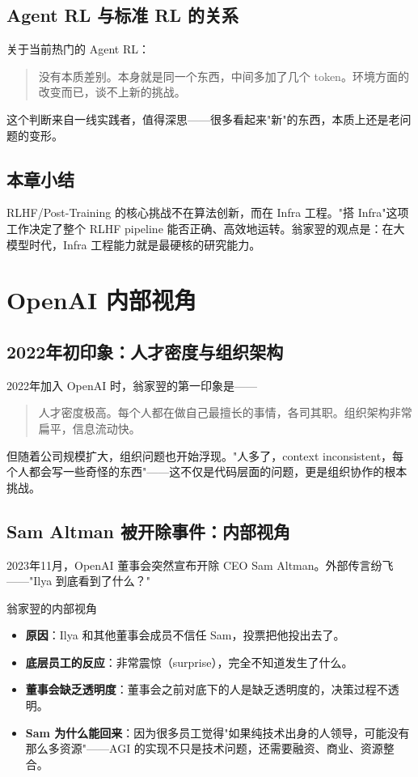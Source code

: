 \documentclass[a4paper]{article}
\begin{document}
\subsection{Agent RL 与标准 RL 的关系}

关于当前热门的 Agent RL：

\begin{quote}
没有本质差别。本身就是同一个东西，中间多加了几个 token。环境方面的改变而已，谈不上新的挑战。
\end{quote}

这个判断来自一线实践者，值得深思——很多看起来"新"的东西，本质上还是老问题的变形。

\subsection{本章小结}
RLHF/Post-Training 的核心挑战不在算法创新，而在 Infra 工程。"搭 Infra"这项工作决定了整个 RLHF pipeline 能否正确、高效地运转。翁家翌的观点是：在大模型时代，Infra 工程能力就是最硬核的研究能力。

\section{OpenAI 内部视角}

\subsection{2022年初印象：人才密度与组织架构}

2022年加入 OpenAI 时，翁家翌的第一印象是——

\begin{quote}
人才密度极高。每个人都在做自己最擅长的事情，各司其职。组织架构非常扁平，信息流动快。
\end{quote}

但随着公司规模扩大，组织问题也开始浮现。"人多了，context inconsistent，每个人都会写一些奇怪的东西"——这不仅是代码层面的问题，更是组织协作的根本挑战。

\subsection{Sam Altman 被开除事件：内部视角}

2023年11月，OpenAI 董事会突然宣布开除 CEO Sam Altman。外部传言纷飞——"Ilya 到底看到了什么？"

\begin{importantbox}{翁家翌的内部视角}

\begin{itemize}
\item \textbf{原因}：Ilya 和其他董事会成员不信任 Sam，投票把他投出去了。
\item \textbf{底层员工的反应}：非常震惊（surprise），完全不知道发生了什么。
\item \textbf{董事会缺乏透明度}：董事会之前对底下的人是缺乏透明度的，决策过程不透明。
\item \textbf{Sam 为什么能回来}：因为很多员工觉得"如果纯技术出身的人领导，可能没有那么多资源"——AGI 的实现不只是技术问题，还需要融资、商业、资源整合。
\end{itemize}
\end{importantbox}
\end{document}

